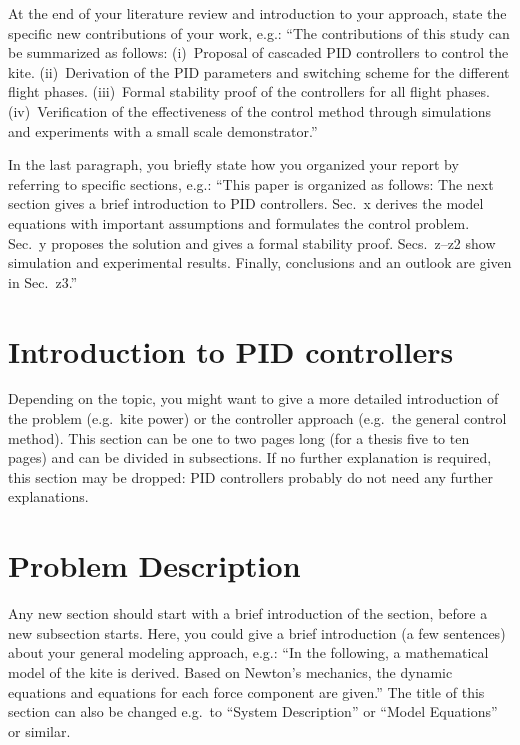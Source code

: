 \documentclass[journal]{IEEEtran}
\newcounter{assumption}
\begin{document}
At the end of your literature review and introduction to your approach, state the specific new contributions of your work, e.g.: “The contributions of this study can be summarized as follows: (i)~Proposal of cascaded PID controllers to control the kite. (ii)~Derivation of the PID parameters and switching scheme for the different flight phases. (iii)~Formal stability proof of the controllers for all flight phases. (iv)~Verification of the effectiveness of the control method through simulations and experiments with a small scale demonstrator.”

In the last paragraph, you briefly state how you organized your report by referring to specific sections, e.g.: “This paper is organized as follows: The next section gives a brief introduction to PID controllers. Sec.~x derives the model equations with important assumptions and formulates the control problem. Sec.~y proposes the solution and gives a formal stability proof. Secs.~z--z2 show simulation and experimental results. Finally, conclusions and an outlook are given in Sec.~z3.”


\section{Introduction to PID controllers}

Depending on the topic, you might want to give a more detailed introduction of the problem (e.g.\ kite power) or the controller approach (e.g.\ the general control method). This section can be one to two pages long (for a thesis five to ten pages) and can be divided in subsections. If no further explanation is required, this section may be dropped: PID controllers probably do not need any further explanations.



\section{Problem Description}

Any new section should start with a brief introduction of the section, before a new subsection starts. Here, you could give a brief introduction (a few sentences) about your general modeling approach, e.g.: “In the following, a mathematical model of the kite is derived. Based on Newton's mechanics, the dynamic equations and equations for each force component are given.” The title of this section can also be changed e.g.\ to “System Description” or “Model Equations” or similar.
\end{document}
